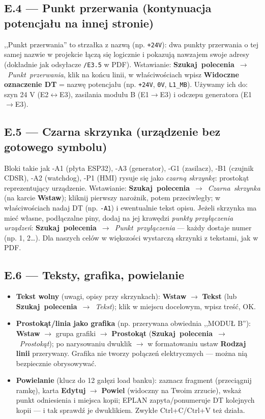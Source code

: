 \documentclass[11pt,a4paper]{article}
\newcommand{\ui}[1]{\textbf{#1}}                    %
\newcommand{\szukaj}[1]{\mbox{\ui{Szukaj polecenia} $\to$ \emph{#1}}} %
\begin{document}
\subsection*{E.4 --- Punkt przerwania (kontynuacja potencjału na innej stronie)}
,,Punkt przerwania'' to strzałka z nazwą (np. \texttt{+24V}): dwa punkty przerwania o tej samej
nazwie w projekcie łączą się logicznie i pokazują nawzajem swoje adresy (dokładnie jak
odsyłacze \texttt{/E3.5} w PDF). Wstawianie: \szukaj{Punkt przerwania}, klik na końcu linii,
w właściwościach wpisz \ui{Widoczne oznaczenie DT} = nazwę potencjału (np. \texttt{+24V},
\texttt{0V}, \texttt{L1\_MB}). Używamy ich do: szyn 24 V (E2$\leftrightarrow$E3), zasilania
modułu B (E1$\to$E3) i odczepu generatora (E1$\to$E3).

\subsection*{E.5 --- Czarna skrzynka (urządzenie bez gotowego symbolu)}
Bloki takie jak -A1 (płyta ESP32), -A3 (generator), -G1 (zasilacz), -B1 (czujnik CDSR),
-A2 (watchdog), -P1 (HMI) rysuje się jako \emph{czarną skrzynkę}: prostokąt reprezentujący
urządzenie. Wstawianie: \szukaj{Czarna skrzynka} (na karcie \ui{Wstaw});
kliknij pierwszy narożnik, potem przeciwległy; w właściwościach nadaj DT (np. \texttt{-A1})
i ewentualnie tekst opisu. Jeżeli skrzynka ma mieć własne, podłączalne piny, dodaj na jej
krawędzi \emph{punkty przyłączenia urządzeń}: \szukaj{Punkt przyłączenia} --- każdy dostaje numer
(np. 1, 2\ldots). Dla naszych celów w większości wystarczą skrzynki z tekstami, jak w PDF.

\subsection*{E.6 --- Teksty, grafika, powielanie}
\begin{itemize}
\item \textbf{Tekst wolny} (uwagi, opisy przy skrzynkach): \ui{Wstaw} $\to$ \ui{Tekst}
(lub \szukaj{Tekst}); klik w miejscu docelowym, wpisz treść, OK.
\item \textbf{Prostokąt/linia jako grafika} (np. przerywana obwiednia ,,MODUŁ B''):
\ui{Wstaw} $\to$ grupa grafiki $\to$ \ui{Prostokąt} (\szukaj{Prostokąt}); po narysowaniu
dwuklik $\to$ w formatowaniu ustaw \ui{Rodzaj linii} przerywany. Grafika nie tworzy połączeń
elektrycznych --- można nią bezpiecznie obrysowywać.
\item \textbf{Powielanie} (klucz do 12 gałęzi load banku): zaznacz fragment (przeciągnij ramkę),
karta \ui{Edytuj} $\to$ \ui{Powiel} (widoczny na Twoim zrzucie), wskaż punkt odniesienia
i miejsca kopii; EPLAN zapyta/ponumeruje DT kolejnych kopii --- i tak sprawdź je dwuklikiem.
Zwykłe Ctrl+C/Ctrl+V też działa.
\end{itemize}
\end{document}
